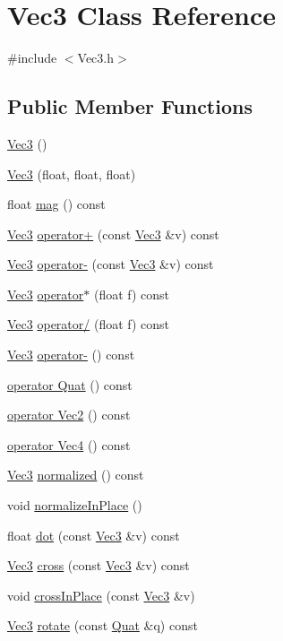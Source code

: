 \hypertarget{class_vec3}{}\section{Vec3 Class Reference}
\label{class_vec3}


{\ttfamily \#include $<$Vec3.\+h$>$}

\subsection*{Public Member Functions}
\begin{DoxyCompactItemize}
\item 
\hyperlink{class_vec3_aae7a1ffaa1108a30c281da216d1cd312}{Vec3} ()
\item 
\hyperlink{class_vec3_ab16df64046dd85eaa0983e8502cb8f19}{Vec3} (float, float, float)
\item 
float \hyperlink{class_vec3_a5b44c16b42617688072da32be123fb5a}{mag} () const 
\item 
\hyperlink{class_vec3}{Vec3} \hyperlink{class_vec3_adec48f417bf615cc6cf0a8ffe341f1de}{operator+} (const \hyperlink{class_vec3}{Vec3} \&v) const 
\item 
\hyperlink{class_vec3}{Vec3} \hyperlink{class_vec3_a49049bcd64d50fda9b7ff12faec03792}{operator-\/} (const \hyperlink{class_vec3}{Vec3} \&v) const 
\item 
\hyperlink{class_vec3}{Vec3} \hyperlink{class_vec3_a4f37a5335b2f21e22e70ffb71eb54309}{operator$\ast$} (float f) const 
\item 
\hyperlink{class_vec3}{Vec3} \hyperlink{class_vec3_a98f59bab30c80bdae1a3655df3c6fae6}{operator/} (float f) const 
\item 
\hyperlink{class_vec3}{Vec3} \hyperlink{class_vec3_a409f2d24c2f1df322ff7c44cebfd5094}{operator-\/} () const 
\item 
\hyperlink{class_vec3_a850a513210b4c946b80ceab32bdb032c}{operator Quat} () const 
\item 
\hyperlink{class_vec3_ae0661cc81af0cf260ddf543b5a3f483d}{operator Vec2} () const 
\item 
\hyperlink{class_vec3_a4c5bbeab21a22d5b1997c44479cad115}{operator Vec4} () const 
\item 
\hyperlink{class_vec3}{Vec3} \hyperlink{class_vec3_a8a0ad811b0676d6374aed339f3c4f761}{normalized} () const 
\item 
void \hyperlink{class_vec3_a324755bebf445a660cb0834cdf5550da}{normalize\+In\+Place} ()
\item 
float \hyperlink{class_vec3_a3e44be3e38e8a09790627c88d7357f06}{dot} (const \hyperlink{class_vec3}{Vec3} \&v) const 
\item 
\hyperlink{class_vec3}{Vec3} \hyperlink{class_vec3_a85bfd45b956fdd79f7686b9d220576f5}{cross} (const \hyperlink{class_vec3}{Vec3} \&v) const 
\item 
void \hyperlink{class_vec3_aabeebb8a2e0050e57ff195a300c6396d}{cross\+In\+Place} (const \hyperlink{class_vec3}{Vec3} \&v)
\item 
\hyperlink{class_vec3}{Vec3} \hyperlink{class_vec3_aaa44770080f63a89e68f2bee866905e0}{rotate} (const \hyperlink{class_quat}{Quat} \&q) const 
\end{DoxyCompactItemize}
